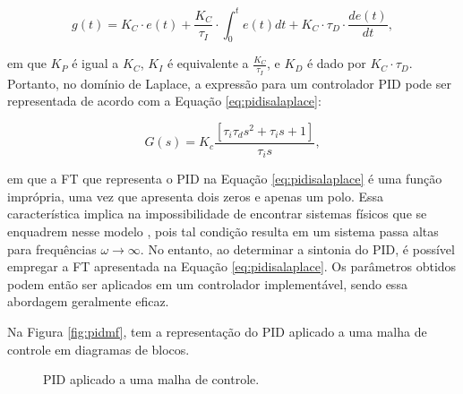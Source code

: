 \documentclass[12pt,           %
a4paper,                       %
openany,                       %
oneside,                       %
chapter=TITLE,                 %
english,                       %
spanish,                       %
brazil,                        %
sumario=tradicional]{abntex2}  %
\begin{document}
\begin{OnehalfSpace}
\begin{equation}%
     \label{eq:pidisa}
        g(t) = K_C \cdot e(t) + \frac{K_C}{\tau_I}\cdot \int_0^t e(t) dt + K_C\cdot \tau_D \cdot \frac{de(t)}{dt},
\end{equation}

\noindent em que \(K_P\) é igual a \(K_C\), \(K_I\) é equivalente a \(\frac{K_C}{\tau_I}\), e \(K_D\) é dado por \(K_C \cdot \tau_D\). Portanto, no domínio de Laplace, a expressão para um controlador PID pode ser representada de acordo com a Equação \ref{eq:pidisalaplace}:

\begin{equation}%
     \label{eq:pidisalaplace}
        G(s) = K_c\frac{[\tau_i \tau_d s^2 + \tau_i s + 1]}{\tau_i s},
\end{equation}

\noindent em que a FT que representa o PID na Equação \ref{eq:pidisalaplace} é uma função imprópria, uma vez que apresenta dois zeros e apenas um polo. Essa característica implica na impossibilidade de encontrar sistemas físicos que se enquadrem nesse modelo \cite{aguirre2004}, pois tal condição resulta em um sistema passa altas para frequências $\omega \rightarrow \infty$. No entanto, ao determinar a sintonia do PID, é possível empregar a FT apresentada na Equação \ref{eq:pidisalaplace}. Os parâmetros obtidos podem então ser aplicados em um controlador implementável, sendo essa abordagem geralmente eficaz.

Na Figura \ref{fig:pidmf}, tem a representação do PID aplicado a uma malha de controle em diagramas de blocos.

\begin{figure}[H]
\vspace*{-0.25cm}
\centering
\caption{PID aplicado a uma malha de controle.}
\end{figure}
\end{OnehalfSpace}
\end{document}
